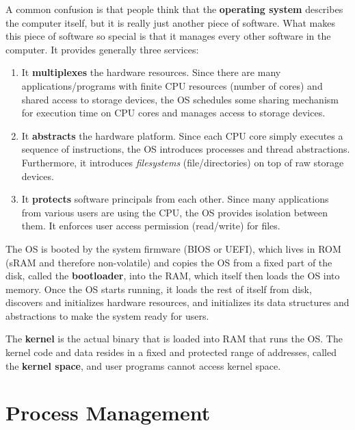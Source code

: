 \documentclass{article}
\newcounter{definition}[section]
\newcounter{code}[section]
\begin{document}
  \begin{definition}
    \label{def:operating-system}
    A common confusion is that people think that the \textbf{operating system} describes the computer itself, but it is really just another piece of software. What makes this piece of software so special is that it manages every other software in the computer. It provides generally three services: 
    \begin{enumerate}
      \item It \textbf{multiplexes} the hardware resources. Since there are many applications/programs with finite CPU resources (number of cores) and shared access to storage devices, the OS schedules some sharing mechanism for execution time on CPU cores and manages access to storage devices.
      \item It \textbf{abstracts} the hardware platform. Since each CPU core simply executes a sequence of instructions, the OS introduces processes and thread abstractions. Furthermore, it introduces \textit{filesystems} (file/directories) on top of raw storage devices. 
      \item It \textbf{protects} software principals from each other. Since many applications from various users are using the CPU, the OS provides isolation between them. It enforces user access permission (read/write) for files. 
    \end{enumerate}
  \end{definition}

  The OS is booted by the system firmware (BIOS or UEFI), which lives in ROM (sRAM and therefore non-volatile) and copies the OS from a fixed part of the disk, called the \textbf{bootloader}, into the RAM, which itself then loads the OS into memory. Once the OS starts running, it loads the rest of itself from disk, discovers and initializes hardware resources, and initializes its data structures and abstractions to make the system ready for users.

  \begin{definition}[Kernel]
    \label{def:kernel}
    The \textbf{kernel} is the actual binary that is loaded into RAM that runs the OS. The kernel code and data resides in a fixed and protected range of addresses, called the \textbf{kernel space}, and user programs cannot access kernel space. 
  \end{definition}

\section{Process Management}
\end{document}
